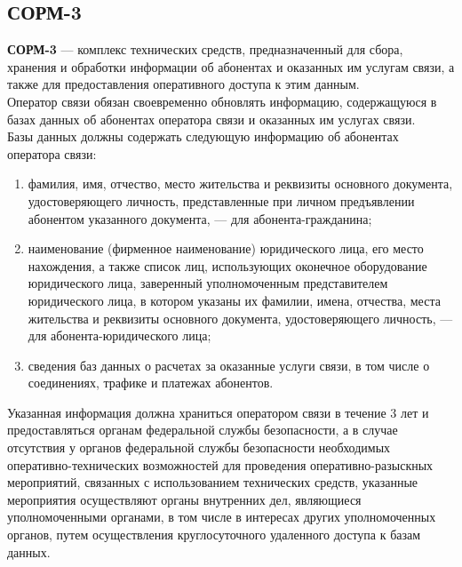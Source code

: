 \subsection{СОРМ-3}
\textbf{СОРМ-3} --- комплекс технических средств, предназначенный для сбора, хранения и обработки информации об абонентах и оказанных им услугам связи, а также для предоставления оперативного доступа к этим данным.\\
Оператор связи обязан своевременно обновлять информацию, содержащуюся в базах данных об абонентах оператора связи и оказанных им услугах связи.\\
Базы данных должны содержать следующую информацию об абонентах оператора связи:
\begin{enumerate}
\item фамилия, имя, отчество, место жительства и реквизиты основного документа, удостоверяющего личность, представленные при личном предъявлении абонентом указанного документа, --- для абонента-гражданина;
\item наименование (фирменное наименование) юридического лица, его место нахождения, а также список лиц, использующих оконечное оборудование юридического лица, заверенный уполномоченным представителем юридического лица, в котором указаны их фамилии, имена, отчества, места жительства и реквизиты основного документа, удостоверяющего личность, --- для абонента-юридического лица;
\item сведения баз данных о расчетах за оказанные услуги связи, в том числе о соединениях, трафике и платежах абонентов.
\end{enumerate}
Указанная информация должна храниться оператором связи в течение 3 лет и предоставляться органам федеральной службы безопасности, а в случае отсутствия у органов федеральной службы безопасности необходимых оперативно-технических возможностей для проведения оперативно-разыскных мероприятий, связанных с использованием технических средств, указанные мероприятия осуществляют органы внутренних дел, являющиеся уполномоченными органами, в том числе в интересах других уполномоченных органов, путем осуществления круглосуточного удаленного доступа к базам данных\cite{sorm_sorm3}.
